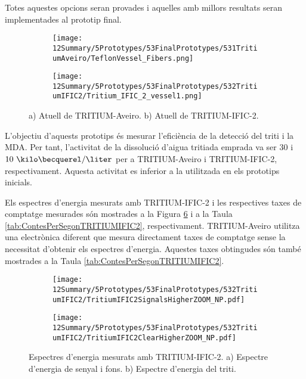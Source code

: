 Totes aquestes opcions seran provades i aquelles amb millors resultats seran implementades al prototip final.
\begin{figure}
\centering
    \begin{subfigure}[b]{0.5\textwidth}
    \centering
    \texttt{[image: 12Summary/5Prototypes/53FinalPrototypes/531TritiumAveiro/TeflonVessel\_Fibers.png]}  
        \caption{}\label{subfig:PrototipAveiro}
    \end{subfigure}
    \hfill
    \begin{subfigure}[b]{0.5\textwidth}
    \centering
    \texttt{[image: 12Summary/5Prototypes/53FinalPrototypes/532TritiumIFIC2/Tritium\_IFIC\_2\_vessel1.png]}  
    \caption{\label{subfig:PrototipIFIC2}}
    \end{subfigure}
\caption{a) Atuell de TRITIUM-Aveiro. b) Atuell de TRITIUM-IFIC-2. \label{fig:PrototipsAveiroIFIC2}}
\end{figure}
L'objectiu d'aquests prototips és mesurar l'eficiència de la detecció del triti i la MDA. Per tant, l'activitat de la dissolució d'aigua tritiada emprada va ser $30$ i $10~\kilo\becquerel/\liter$ per a TRITIUM-Aveiro i TRITIUM-IFIC-2, respectivament. Aquesta activitat es inferior a la utilitzada en els prototips inicials.

Els espectres d'energia mesurats amb TRITIUM-IFIC-2 i les respectives taxes de comptatge mesurades són  mostrades a la Figura \ref{fig:EspectresEnergeticsTRITIUMIFIC2} i a la Taula \ref{tab:ContesPerSegonTRITIUMIFIC2}, respectivament. TRITIUM-Aveiro utilitza una electrònica diferent que mesura directament taxes de comptatge sense la necessitat d'obtenir els espectres d'energia. Aquestes taxes obtingudes són també mostrades a la Taula \ref{tab:ContesPerSegonTRITIUMIFIC2}.

\begin{figure}
\centering
    \begin{subfigure}[b]{1\textwidth}
    \centering
    \texttt{[image: 12Summary/5Prototypes/53FinalPrototypes/532TritiumIFIC2/TritiumIFIC2SignalsHigherZOOM\_NP.pdf]}  
    \caption{\label{subfig:EspectreEnergeticSenyalFonsTritiumIFIC2}}
    \end{subfigure}
    \hfill
    \begin{subfigure}[b]{1\textwidth}
    \centering
    \texttt{[image: 12Summary/5Prototypes/53FinalPrototypes/532TritiumIFIC2/TritiumIFIC2ClearHigherZOOM\_NP.pdf]}  
    \caption{\label{subfig:EspectreEnergeticTritiTritiumIFIC2}}
    \end{subfigure}
 \caption{Espectres d'energia mesurats amb TRITIUM-IFIC-2. a) Espectre d'energia de senyal i fons. b) Espectre d'energia del triti.}
 \label{fig:EspectresEnergeticsTRITIUMIFIC2}
\end{figure}

